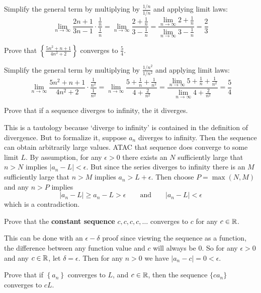 \documentclass{article}
\begin{document}
Simplify the general term by multiplying by $\frac{1/n}{1/n}$ and applying limit laws:
$$\lim_{n\to\infty} \frac{2n + 1}{3n - 1}\cdot \frac{ \frac{1}{n}}{\frac{1}{n}} = \lim_{n\to\infty} \frac{2 + \frac{1}{n}}{3 - \frac{1}{n}} = \frac{\lim\limits_{n\to\infty}2 + \frac{1}{n}}{\lim\limits_{n\to\infty} 3 - \frac{1}{n}} = \frac{2}{3}$$

\begin{problem}
Prove that $\left\{ \frac{5n^2 + n + 1}{4n^2 + 2} \right\}$ converges to $\frac{5}{4}$.
\end{problem}

Simplify the general term by multiplying by $\frac{1/n^2}{1/n^2}$ and applying limit laws:
$$\lim_{n\to\infty} \frac{5n^2 + n + 1}{4n^2 + 2}\cdot \frac{ \frac{1}{n^2}}{\frac{1}{n^2}} = \lim_{n\to\infty} \frac{5 + \frac{1}{n} + \frac{1}{n^2}}{4 + \frac{2}{n^2}} = \frac{\lim\limits_{n\to\infty}5 + \frac{1}{n} + \frac{1}{n^2}}{\lim\limits_{n\to\infty} 4 + \frac{2}{n^2}} = \frac{5}{4}$$

\begin{problem}
Prove that if a sequence diverges to infinity, the it diverges.
\end{problem}

This is a tautology because `diverge to infinity' is contained in the definition of divergence. But to formalize it, suppose $a_n$ diverges to infinity. Then the sequence can obtain arbitrarily large values. ATAC that sequence does converge to some limit $L$. By assumption, for any $\epsilon > 0$ there exists an $N$ sufficiently large that $n > N$ implies $|a_n - L| < \epsilon$. But since the series diverges to infinity there is an $M$ sufficiently large that $n > M$ implies $a_n > L + \epsilon$. Then choose $P = \max(N, M)$ and any $n > P$ implies
$$|a_n - L| \geq a_n - L > \epsilon \qquad \text {and} \qquad |a_n - L| < \epsilon$$
which is a contradiction.

\begin{problem}
Prove that the \textbf{constant sequence} $c, c, c, c, \ldots$ converges to $c$ for any $c \in \mathbb{R}$.
\end{problem}

This can be done with an $\epsilon-\delta$ proof since viewing the sequence as a function, the difference between any function value and $c$ will always be 0. So for any $\epsilon > 0$ and any $c \in \mathbb{R}$, let $\delta = \epsilon$. Then for any $n > 0$ we have $|a_n - c| = 0 < \epsilon$.

\begin{problem}
Prove that if $\left\{a_n\right\}$ converges to $L$, and $c \in \mathbb{R}$, then the sequence $\{c a_n\}$ converges to $cL$.
\end{problem}
\end{document}

